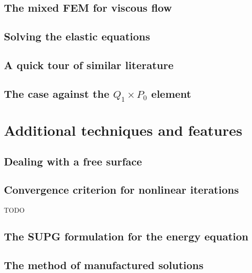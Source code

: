 \documentclass[a4paper]{article}
\begin{document}
\subsection{The mixed FEM for viscous flow}  %
\subsection{Solving the elastic equations} %
\subsection{A quick tour of similar literature}  %
\subsection{The case against the $Q_1\times P_0$ element}  %




\newpage
\section{Additional techniques and features} %
\subsection{Dealing with a free surface} 
\subsection{Convergence criterion for nonlinear iterations} TODO

\newpage %
\subsection{The SUPG formulation for the energy equation} \label{sec:supg}  %
\newpage %
\subsection{The method of manufactured solutions \label{mms}}  %
\newpage %
\end{document}
